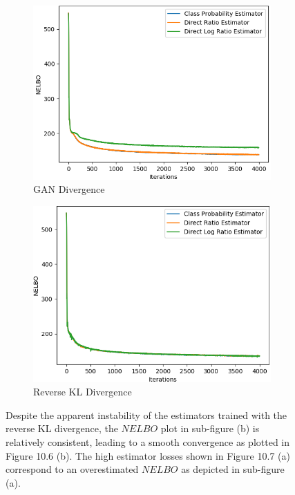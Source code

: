 \documentclass[honours,12pt]{unswthesis}
\numberwithin{equation}{section}
\theoremstyle{definition}
\begin{document}
\begin{figure}[h!]
\centering
\begin{subfigure}{0.49\textwidth}
\includegraphics[width=\linewidth]{part3nelbos/PCADVvsPCADVexpvsPCADVgudlog.png}
\caption{GAN Divergence}
\end{subfigure}
\begin{subfigure}{0.49\textwidth}
\includegraphics[width=\linewidth]{part3nelbos/PCKLDvsPCKLexpvsPCKLgudlog.png}
\caption{Reverse KL Divergence}
\end{subfigure}
\caption{\small Despite the apparent instability of the estimators trained with the reverse KL divergence, the $NELBO$ plot in sub-figure (b) is relatively consistent, leading to a smooth convergence as plotted in Figure 10.6 (b). The high estimator losses shown in Figure 10.7 (a) correspond to an overestimated $NELBO$ as depicted in sub-figure (a).}
\end{figure}
\end{document}
